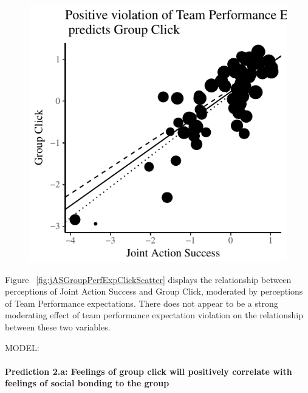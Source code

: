 \documentclass[english]{article}\usepackage[]{graphicx}\usepackage[]{color}
\makeatletter
\def\maxwidth{ %
  \ifdim\Gin@nat@width>\linewidth
    \linewidth
  \else
    \Gin@nat@width
  \fi
}
\newenvironment{knitrout}{}{} %
\newcommand{\myparagraph}[1]{\paragraph{#1}\mbox{}\\}
\makeatother
\begin{document}
\begin{knitrout}
\begin{figure}
{\centering \includegraphics[width=\maxwidth]{figure/jASGroupPerfExpClickScatter-1} 

}

\end{figure}


\end{knitrout}

Figure ~\ref{fig:jASGroupPerfExpClickScatter} displays the relationship between perceptions of Joint Action Success and Group Click, moderated by perceptions of Team Performance expectations.  There does not appear to be a strong moderating effect of team performance expectation violation on the relationship between these two variables.

MODEL:

\myparagraph{Prediction 2.a: Feelings of group click will positively correlate with feelings of social bonding to the group}
\end{document}
